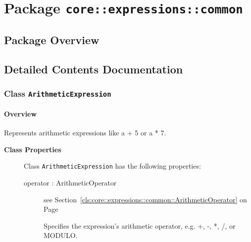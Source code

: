 \section{Package \bfseries \texttt{core::expressions::common}\normalfont}
\subsection{Package Overview}
	
			
		



\subsection{Detailed Contents Documentation}
\subsubsection{\Large{Class \bfseries \texttt{ArithmeticExpression}\normalfont}}
\label{cls:core::expressions::common::ArithmeticExpression} 
\paragraph{Overview}

	
			
Represents arithmetic expressions like a + 5 or a * 7.	
		
	


\begin{description}

	\item[\textbf{Class Properties}] Class \texttt{ArithmeticExpression} has the following properties:
	\begin{description}
\item[operator : ArithmeticOperator 	]
see Section~\ref{cls:core::expressions::common::ArithmeticOperator} on Page~\pageref{cls:core::expressions::common::ArithmeticOperator}
\hspace{\fill}
\nopagebreak


	
			
Specifies the expression's arithmetic operator, e.g. +, -, *, /, or MODULO.	
		
	
	\end{description}
	
	

\end{description}

